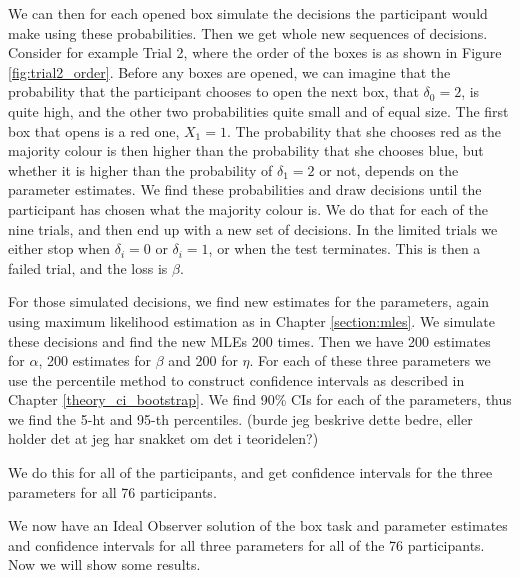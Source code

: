 We can then for each opened box simulate the decisions the participant would make using these probabilities. Then we get whole new sequences of decisions. Consider for example Trial 2, where the order of the boxes is as shown in Figure \ref{fig:trial2_order}. Before any boxes are opened, we can imagine that the probability that the participant chooses to open the next box, that $\delta_0=2$, is quite high, and the other two probabilities quite small and of equal size. The first box that opens is a red one, $X_1=1$. The probability that she chooses red as the majority colour is then higher than the probability that she chooses blue, but whether it is higher than the probability of $\delta_1=2$ or not, depends on the parameter estimates. We find these probabilities and draw decisions until the participant has chosen what the majority colour is. We do that for each of the nine trials, and then end up with a new set of decisions. In the limited trials we either stop when $\delta_i=0$ or $\delta_i=1$, or when the test terminates. This is then a failed trial, and the loss is $\beta$. 

For those simulated decisions, we find new estimates for the parameters, again using maximum likelihood estimation as in Chapter \ref{section:mles}. We simulate these decisions and find the new MLEs 200 times. Then we have 200 estimates for $\alpha$, 200 estimates for $\beta$ and 200 for $\eta$. For each of these three parameters we use the percentile method to construct confidence intervals as described in Chapter \ref{theory_ci_bootstrap}. We find 90\% CIs for each of the parameters, thus we find the 5-ht and 95-th percentiles. (burde jeg beskrive dette bedre, eller holder det at jeg har snakket om det i teoridelen?) 

We do this for all of the participants, and get confidence intervals for the three parameters for all 76 participants. 

We now have an Ideal Observer solution of the box task and parameter estimates and confidence intervals for all three parameters for all of the 76 participants. Now we will show some results.